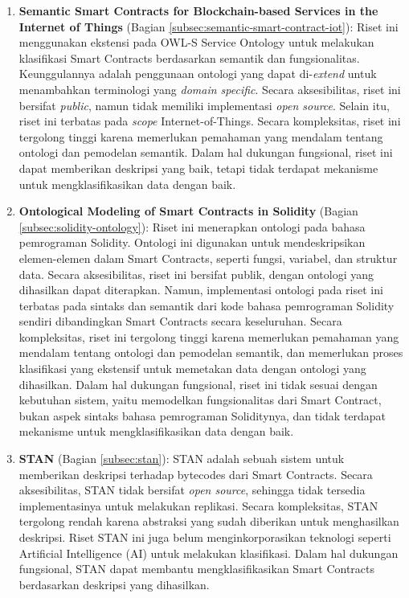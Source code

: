 \begin{enumerate}
	\item \textbf{Semantic Smart Contracts for Blockchain-based Services in the Internet of Things} \parencite{baqa2019semantic} (Bagian \ref{subsec:semantic-smart-contract-iot}): Riset ini menggunakan ekstensi pada OWL-S Service Ontology untuk melakukan klasifikasi Smart Contracts berdasarkan semantik dan fungsionalitas. Keunggulannya adalah penggunaan ontologi yang dapat di-\textit{extend} untuk menambahkan terminologi yang \textit{domain specific}. Secara aksesibilitas, riset ini bersifat \textit{public}, namun tidak memiliki implementasi \textit{open source}. Selain itu, riset ini terbatas pada \textit{scope} Internet-of-Things. Secara kompleksitas, riset ini tergolong tinggi karena memerlukan pemahaman yang mendalam tentang ontologi dan pemodelan semantik. Dalam hal dukungan fungsional, riset ini dapat memberikan deskripsi yang baik, tetapi tidak terdapat mekanisme untuk mengklasifikasikan data dengan baik.

	\item \textbf{Ontological Modeling of Smart Contracts in Solidity} \parencite{cano2021toward} (Bagian \ref{subsec:solidity-ontology}): Riset ini menerapkan ontologi pada bahasa pemrograman Solidity. Ontologi ini digunakan untuk mendeskripsikan elemen-elemen dalam Smart Contracts, seperti fungsi, variabel, dan struktur data. Secara aksesibilitas, riset ini bersifat publik, dengan ontologi yang dihasilkan dapat diterapkan. Namun, implementasi ontologi pada riset ini terbatas pada sintaks dan semantik dari kode bahasa pemrograman Solidity sendiri dibandingkan Smart Contracts secara keseluruhan. Secara kompleksitas, riset ini tergolong tinggi karena memerlukan pemahaman yang mendalam tentang ontologi dan pemodelan semantik, dan memerlukan proses klasifikasi yang ekstensif untuk memetakan data dengan ontologi yang dihasilkan. Dalam hal dukungan fungsional, riset ini tidak sesuai dengan kebutuhan sistem, yaitu memodelkan fungsionalitas dari Smart Contract, bukan aspek sintaks bahasa pemrograman Soliditynya, dan tidak terdapat mekanisme untuk mengklasifikasikan data dengan baik.

	\item \textbf{STAN} \parencite{stan} (Bagian \ref{subsec:stan}): STAN adalah sebuah sistem untuk memberikan deskripsi terhadap bytecodes dari Smart Contracts. Secara aksesibilitas, STAN tidak bersifat \textit{open source}, sehingga tidak tersedia implementasinya untuk melakukan replikasi. Secara kompleksitas, STAN tergolong rendah karena abstraksi yang sudah diberikan untuk menghasilkan deskripsi. Riset STAN ini juga belum menginkorporasikan teknologi seperti Artificial Intelligence (AI) untuk melakukan klasifikasi. Dalam hal dukungan fungsional, STAN dapat membantu mengklasifikasikan Smart Contracts berdasarkan deskripsi yang dihasilkan.


\end{enumerate}
